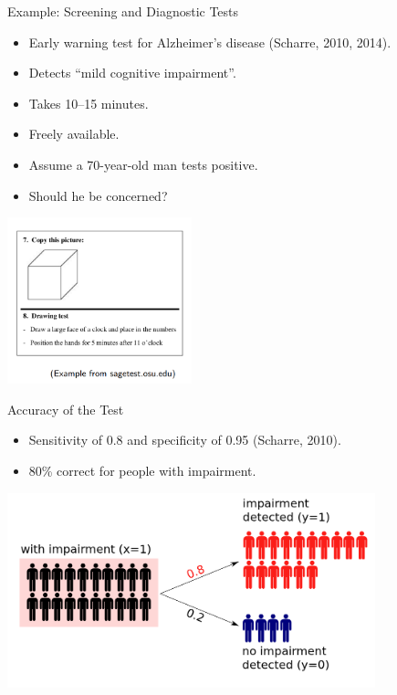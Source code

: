 \documentclass{beamer}
\begin{document}
\begin{frame}{Example: Screening and Diagnostic Tests}
\begin{itemize}
  \item Early warning test for Alzheimer’s disease (Scharre, 2010, 2014).
  \item Detects “mild cognitive impairment”.
  \item Takes 10–15 minutes.
  \item Freely available.
  \item Assume a 70-year-old man tests positive.
  \item Should he be concerned?
\end{itemize}
\begin{center}
  \includegraphics[width=0.4\textwidth]{sagetest_logo.png}
\end{center}
\end{frame}

\begin{frame}{Accuracy of the Test}
\begin{itemize}
  \item Sensitivity of 0.8 and specificity of 0.95 (Scharre, 2010).
  \item 80\% correct for people with impairment.
\end{itemize}
\begin{center}
  \includegraphics[width=0.8\textwidth]{with_impairment.png}
\end{center}
\end{frame}
\end{document}
